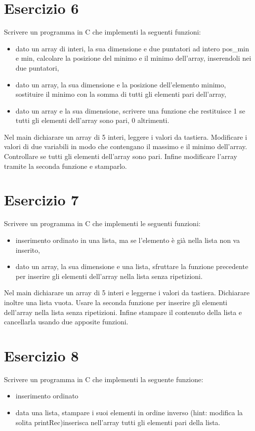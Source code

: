 \documentclass[italian,oneside,headinclude,10pt]{scrartcl}
\begin{document}
\section{Esercizio 6}
Scrivere un programma in C che implementi la seguenti funzioni:
\begin{itemize} 
    \item dato un array di interi, la sua dimensione e due puntatori ad intero \textrm{pos\_min} e \textrm{min}, calcolare la posizione del minimo e il minimo dell'array, inserendoli nei due puntatori,
    \item dato un array, la sua dimensione  e la posizione dell'elemento minimo, sostituire il minimo con la somma di tutti gli elementi pari dell'array,
    \item dato un array e la sua dimensione, scrivere una funzione che restituisce 1 se tutti gli elementi dell'array sono pari, 0 altrimenti.
\end{itemize}

Nel main dichiarare un array di 5 interi, leggere i valori da tastiera. Modificare i valori di due variabili in modo che contengano il massimo e il minimo dell'array. Controllare se tutti gli elementi dell'array sono pari. Infine modificare l'array tramite la seconda funzione e stamparlo.

\section{Esercizio 7}
Scrivere un programma in C che implementi le seguenti funzioni:
\begin{itemize}
    \item inserimento ordinato in una lista, ma se l'elemento è già nella lista non va inserito,
    \item dato un array, la sua dimensione e una lista, sfruttare la funzione precedente per inserire gli elementi dell'array nella lista senza ripetizioni.
\end{itemize}

Nel main dichiarare un array di 5 interi e leggerne i valori da tastiera. Dichiarare inoltre una lista vuota. Usare la seconda funzione per inserire gli elementi dell'array nella lista senza ripetizioni. Infine stampare il contenuto della lista e cancellarla usando due apposite funzioni.

\section{Esercizio 8}
Scrivere un programma in C che implementi la seguente funzione:
\begin{itemize}
    \item inserimento ordinato
    \item data una lista, stampare i suoi elementi in ordine inverso (hint: modifica la solita printRec)inserisca nell'array tutti gli elementi pari della lista.
\end{itemize}
\end{document}
